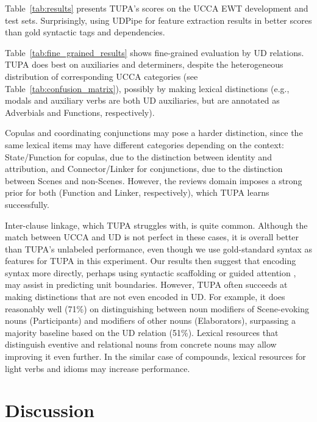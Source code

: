 \documentclass[11pt,a4paper,table]{article}
\begin{document}
Table~\ref{tab:results} presents TUPA's scores on the UCCA EWT development
and test sets. Surprisingly, using UDPipe for feature extraction results in
better scores than gold syntactic tags and dependencies.

Table~\ref{tab:fine_grained_results} shows
fine-grained evaluation by UD relations.
TUPA does best on auxiliaries and determiners,
despite the heterogeneous distribution of corresponding UCCA categories
(see Table~\ref{tab:confusion_matrix}),
possibly by making lexical distinctions
(e.g., modals and auxiliary verbs are both UD auxiliaries,
but are annotated as Adverbials and Functions, respectively).

Copulas and coordinating conjunctions may pose a harder distinction,
since the same lexical items may have different categories depending on the
context: State/Function for copulas,
due to the distinction between identity and attribution, and
Connector/Linker for conjunctions,
due to the distinction between Scenes and non-Scenes.
However, the reviews domain imposes a strong prior for both (Function and Linker,
respectively), which TUPA learns successfully.

Inter-clause linkage, which TUPA struggles with, is quite common.
Although the match between UCCA and UD is not perfect in these cases,
it is overall better than TUPA's unlabeled performance,
even though we use gold-standard syntax as features for TUPA in this experiment.
Our results then suggest that encoding syntax more directly, perhaps using syntactic
scaffolding \citep{swayamdipta2018syntactic}
or guided attention \citep{strubell2018linguistically},
may assist in predicting unit boundaries.
However, TUPA often succeeds at making distinctions that are not even encoded in UD.
For example, it does reasonably well (71\%) on distinguishing between noun modifiers of
Scene-evoking nouns (Participants) and modifiers of other nouns (Elaborators),
surpassing a majority baseline based on the UD relation (51\%).
Lexical resources that distinguish eventive and relational nouns from concrete 
nouns may allow improving it even further.
In the similar case of compounds, lexical resources for light verbs and idioms may increase performance.


\section{Discussion}\label{sec:discussion}
\end{document}

